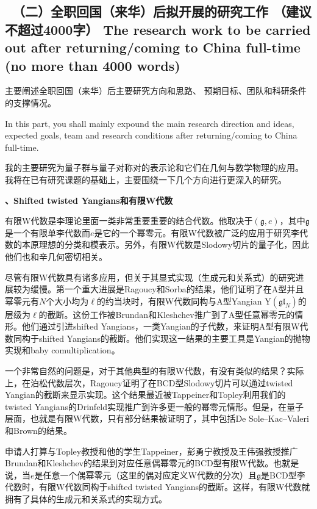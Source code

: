 \documentclass[12pt,UTF8,AutoFakeBold=4,a4paper]{ctexart}
\begin{document}
{\color{MsBlue} \subsection{\sihao \kaishu \qquad \ 
\textbf{（二）全职回国（来华）后拟开展的研究工作} {\normalfont（建议不超过4000字）} 
\bfseries \xiaosihao {} 
The research work to 
be carried out after returning/coming to China full-time (no more than 4000 words)} 
}

 

{\sihao \color{MsBlue} \kaishu 主要阐述全职回国（来华）后主要研究方向和思路、
预期目标、团队和科研条件的支撑情况。}

\medskip

{\color{MsBlue}  
In this part, you shall mainly expound the main research direction and ideas, 
expected goals, team and research conditions after returning/coming to China 
full-time.}

\medskip

我的主要研究为量子群与量子对称对的表示论和它们在几何与数学物理的应用。 我将在已有研究课题的基础上，主要围绕一下几个方向进行更深入的研究。

\textbf{、Shifted twisted Yangians和有限W代数}

有限W代数是李理论里面一类非常重要重要的结合代数。他取决于$(\mathfrak g,e)$，其中$\mathfrak g$是一个有限单李代数而$e$是它的一个幂零元。有限W代数被广泛的应用于研究李代数的本原理想的分类和模表示。另外，有限W代数是Slodowy切片的量子化，因此他们也和辛几何密切相关。

尽管有限W代数具有诸多应用，但关于其显式实现（生成元和关系式）的研究进展较为缓慢。第一个重大进展是Ragoucy和Sorba的结果，他们证明了在A型并且幂零元有$N$个大小均为$\ell$的约当块时，有限W代数同构与A型Yangian $\mathrm{Y}(\mathfrak{gl}_N)$的层级为$\ell$的截断。这份工作被Brundan和Kleshchev推广到了A型任意幂零元的情形。他们通过引进shifted Yangians，一类Yangian的子代数，来证明A型有限W代数同构于shifted Yangians的截断。他们实现这一结果的主要工具是Yangian的抛物实现和baby comultiplication。

一个非常自然的问题是，对于其他典型的有限W代数，有没有类似的结果？实际上，在泊松代数层次，Ragoucy证明了在BCD型Slodowy切片可以通过twisted Yangian的截断来显示实现。这个结果最近被Tappeiner和Topley利用我们的twisted Yangians的Drinfeld实现推广到许多更一般的幂零元情形。但是，在量子层面，也就是有限W代数，只有部分结果被证明了，其中包括De Sole–Kac–Valeri和Brown的结果。

申请人打算与Topley教授和他的学生Tappeiner，彭勇宁教授及王伟强教授推广Brundan和Kleshchev的结果到对应任意偶幂零元的BCD型有限W代数。也就是说，当$e$是任意一个偶幂零元（这里的偶对应定义W代数的分次）且$\mathfrak g$是BCD型李代数时，有限W代数同构于shifted twisted Yangians的截断。这样，有限W代数就拥有了具体的生成元和关系式的实现方式。
\end{document}
